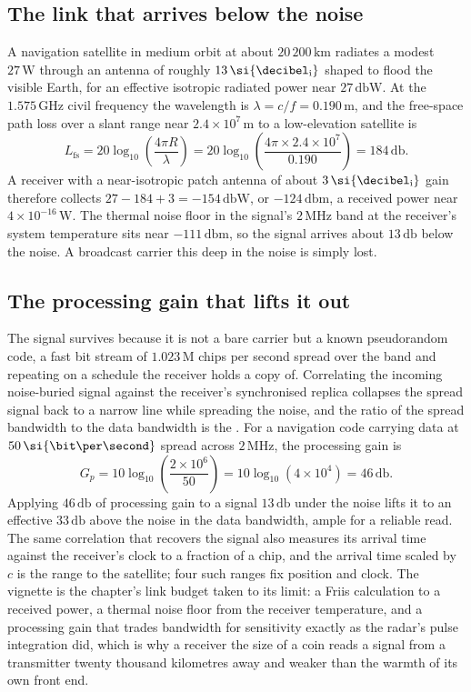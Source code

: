 \subsection{The link that arrives below the noise}

A navigation satellite in medium orbit at about $20\,200\,\si{\kilo\meter}$
radiates a modest $27\,\si{\watt}$ through an antenna of roughly
$13\,\si{\decibel\textsubscript{i}}$ shaped to flood the visible Earth,
for an effective isotropic radiated power near $27\,\si{\decibel}\text{W}$.
At the $1.575\,\si{\giga\hertz}$ civil frequency the wavelength is
$\lambda = c/f = 0.190\,\si{\meter}$, and the free-space path loss over a
slant range near $2.4\times 10^{7}\,\si{\meter}$ to a low-elevation
satellite is
\[
L_{\text{fs}} = 20\log_{10}\!\left(\frac{4\pi R}{\lambda}\right) =
20\log_{10}\!\left(\frac{4\pi\times 2.4\times 10^{7}}{0.190}\right) =
184\,\si{\decibel}.
\]
A receiver with a near-isotropic patch antenna of about
$3\,\si{\decibel\textsubscript{i}}$ gain therefore collects
$27 - 184 + 3 = -154\,\si{\decibel}\text{W}$, or $-124\,\si{\decibel}
\text{m}$, a received power near $4\times 10^{-16}\,\si{\watt}$. The
thermal noise floor in the signal's $2\,\si{\mega\hertz}$ band at the
receiver's system temperature sits near $-111\,\si{\decibel}\text{m}$, so
the signal arrives about $13\,\si{\decibel}$ below the noise. A broadcast
carrier this deep in the noise is simply lost.

\subsection{The processing gain that lifts it out}

The signal survives because it is not a bare carrier but a known
pseudorandom code, a fast bit stream of $1.023\,\text{M}$ chips per
second spread over the band and repeating on a schedule the receiver holds
a copy of. Correlating the incoming noise-buried signal against the
receiver's synchronised replica collapses the spread signal back to a
narrow line while spreading the noise, and the ratio of the spread
bandwidth to the data bandwidth is the . For a
navigation code carrying data at $50\,\si{\bit\per\second}$ spread across
$2\,\si{\mega\hertz}$, the processing gain is
\[
G_p = 10\log_{10}\!\left(\frac{2\times 10^{6}}{50}\right) =
10\log_{10}(4\times 10^{4}) = 46\,\si{\decibel}.
\]
Applying $46\,\si{\decibel}$ of processing gain to a signal $13\,\si{
\decibel}$ under the noise lifts it to an effective $33\,\si{\decibel}$
above the noise in the data bandwidth, ample for a reliable read. The same
correlation that recovers the signal also measures its arrival time
against the receiver's clock to a fraction of a chip, and the arrival time
scaled by $c$ is the range to the satellite; four such ranges fix position
and clock. The vignette is the chapter's link budget taken to its limit: a
Friis calculation to a received power, a thermal noise floor from the
receiver temperature, and a processing gain that trades bandwidth for
sensitivity exactly as the radar's pulse integration did, which is why a
receiver the size of a coin reads a signal from a transmitter twenty
thousand kilometres away and weaker than the warmth of its own front end.

